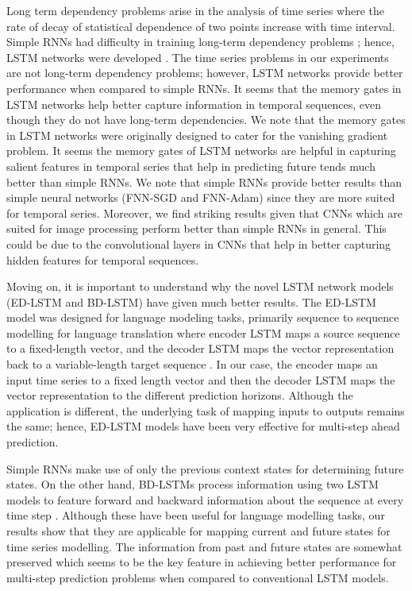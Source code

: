 \documentclass{ieeeaccess}
\begin{document}
 
 Long term dependency problems  arise in the analysis of   time series where  the rate of decay of statistical dependence of two points increase with  time interval. Simple RNNs had difficulty in training   long-term dependency problems \cite{hochreiter1998vanishing}; hence, LSTM networks were developed \cite{hochreiter1997long}. The time series  problems in our experiments  are not long-term dependency problems; however, LSTM networks provide better performance  when compared to  simple RNNs. It seems that  the memory gates in LSTM networks help better capture information in temporal sequences, even though they do not have  long-term dependencies. We note that the memory gates in LSTM networks were originally designed to cater for the vanishing gradient problem. It seems the memory gates of LSTM networks are helpful in capturing salient features in temporal series that help in predicting future tends much better than simple RNNs. We note that simple RNNs provide better results than simple neural networks (FNN-SGD and FNN-Adam) since they are more suited for temporal series. Moreover, we find striking results given that CNNs which are suited for image processing  perform better than simple RNNs in general. This could be due to the convolutional layers in CNNs that help in better capturing hidden features for  temporal sequences. 
  
  Moving on, it is important to understand why the novel LSTM network models (ED-LSTM and BD-LSTM)  have given much better results. The ED-LSTM model was designed for language modeling tasks, primarily sequence to sequence  modelling for language translation where  encoder LSTM maps a source sequence to a fixed-length vector, and the decoder LSTM maps the vector representation back to a variable-length target sequence \cite{sutskever2014sequence}. In our case, the encoder maps an input time series to a fixed length vector and then the decoder LSTM maps the vector representation to the different prediction horizons. Although the application is different, the underlying task of mapping inputs to outputs remains the same; hence, ED-LSTM models have been very effective for multi-step ahead prediction. 
  
  Simple RNNs make use of only the previous context states for determining future states. On the other hand, BD-LSTMs process information using two  LSTM models to feature forward and backward information about the sequence at every time step \cite{graves2005framewise}. Although these have been useful for language modelling tasks, our results show that they are   applicable for mapping current and  future states for time series modelling. The  information from past and future states are somewhat preserved which seems to be the key feature in achieving better performance for multi-step prediction problems when compared to conventional LSTM models. 
 
\end{document}

